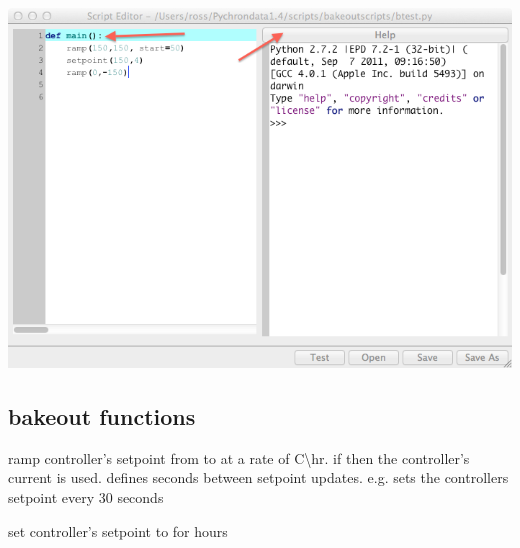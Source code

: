 \documentclass[letterpaper,10pt,english]{sphinxmanual}
\begin{document}
\includegraphics{bakeout_editor.png}


\subsection{bakeout functions}
\label{bakeout_scripting:bakeout-functions}

\begin{fulllineitems}
\label{bakeout_scripting:ramp}
ramp controller's setpoint from  to  at a rate of  C\textbackslash{}hr.
if  then the controller's current  is used.  defines
seconds between setpoint updates. e.g.  sets the controllers setpoint every 30 seconds

\end{fulllineitems}


\begin{fulllineitems}
\label{bakeout_scripting:setpoint}
set controller's setpoint to  for  hours

\end{fulllineitems}
\end{document}
